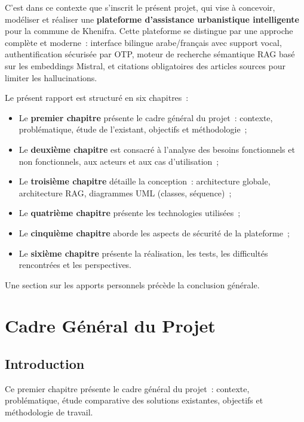 \documentclass[12pt,a4paper]{report}
\begin{document}
C'est dans ce contexte que s'inscrit le présent projet, qui vise à concevoir, modéliser et réaliser une \textbf{plateforme d'assistance urbanistique intelligente} pour la commune de Khenifra. Cette plateforme se distingue par une approche complète et moderne~: interface bilingue arabe/français avec support vocal, authentification sécurisée par OTP, moteur de recherche sémantique RAG basé sur les embeddings Mistral, et citations obligatoires des articles sources pour limiter les hallucinations.

Le présent rapport est structuré en six chapitres~:

\begin{itemize}[label=\textbullet]
    \item Le \textbf{premier chapitre} présente le cadre général du projet~: contexte, problématique, étude de l'existant, objectifs et méthodologie~;
    \item Le \textbf{deuxième chapitre} est consacré à l'analyse des besoins fonctionnels et non fonctionnels, aux acteurs et aux cas d'utilisation~;
    \item Le \textbf{troisième chapitre} détaille la conception~: architecture globale, architecture RAG, diagrammes UML (classes, séquence)~;
    \item Le \textbf{quatrième chapitre} présente les technologies utilisées~;
    \item Le \textbf{cinquième chapitre} aborde les aspects de sécurité de la plateforme~;
    \item Le \textbf{sixième chapitre} présente la réalisation, les tests, les difficultés rencontrées et les perspectives.
\end{itemize}

Une section sur les apports personnels précède la conclusion générale.

\chapter{Cadre Général du Projet}
\label{chap:cadre}

\section{Introduction}

Ce premier chapitre présente le cadre général du projet~: contexte, problématique, étude comparative des solutions existantes, objectifs et méthodologie de travail.
\end{document}
